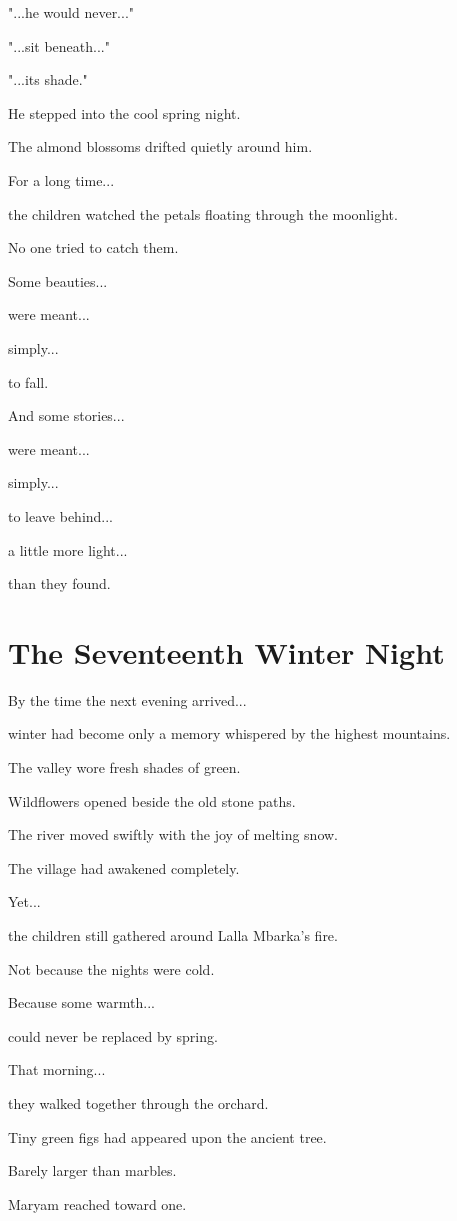 \documentclass[12pt,openany]{book}
\begin{document}
"...he would never..."

"...sit beneath..."

"...its shade."

He stepped into the cool spring night.

The almond blossoms drifted quietly around him.

For a long time...

the children watched the petals floating through the moonlight.

No one tried to catch them.

Some beauties...

were meant...

simply...

to fall.

And some stories...

were meant...

simply...

to leave behind...

a little more light...

than they found.
\chapter{The Seventeenth Winter Night}

By the time the next evening arrived...

winter had become only a memory whispered by the highest mountains.

The valley wore fresh shades of green.

Wildflowers opened beside the old stone paths.

The river moved swiftly with the joy of melting snow.

The village had awakened completely.

Yet...

the children still gathered around Lalla Mbarka's fire.

Not because the nights were cold.

Because some warmth...

could never be replaced by spring.

That morning...

they walked together through the orchard.

Tiny green figs had appeared upon the ancient tree.

Barely larger than marbles.

Maryam reached toward one.
\end{document}
